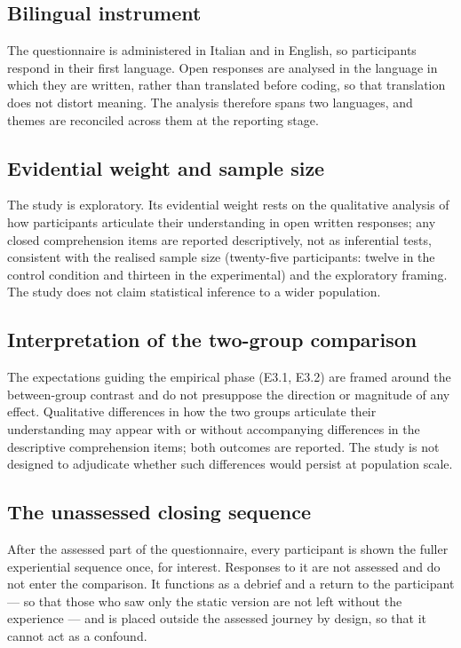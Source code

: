 \subsection*{Bilingual instrument}
The questionnaire is administered in Italian and in English, so participants respond in their first language. Open responses are analysed in the language in which they are written, rather than translated before coding, so that translation does not distort meaning. The analysis therefore spans two languages, and themes are reconciled across them at the reporting stage.

\subsection*{Evidential weight and sample size}
The study is exploratory. Its evidential weight rests on the qualitative analysis of how participants articulate their understanding in open written responses; any closed comprehension items are reported descriptively, not as inferential tests, consistent with the realised sample size (twenty-five participants: twelve in the control condition and thirteen in the experimental) and the exploratory framing. The study does not claim statistical inference to a wider population.

\subsection*{Interpretation of the two-group comparison}
The expectations guiding the empirical phase (E3.1, E3.2) are framed around the between-group contrast and do not presuppose the direction or magnitude of any effect. Qualitative differences in how the two groups articulate their understanding may appear with or without accompanying differences in the descriptive comprehension items; both outcomes are reported. The study is not designed to adjudicate whether such differences would persist at population scale.

\subsection*{The unassessed closing sequence}
After the assessed part of the questionnaire, every participant is shown the fuller experiential sequence once, for interest. Responses to it are not assessed and do not enter the comparison. It functions as a debrief and a return to the participant --- so that those who saw only the static version are not left without the experience --- and is placed outside the assessed journey by design, so that it cannot act as a confound.

